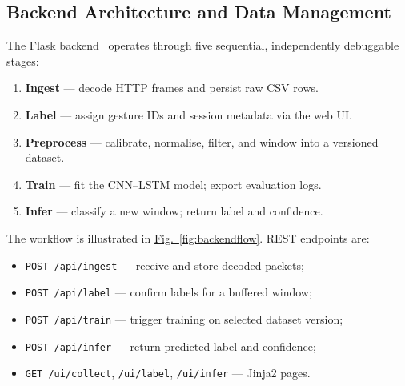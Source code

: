 \documentclass[conference]{IEEEtran}
\newcommand{\FigLink}[1]{\hyperref[#1]{Fig.~\ref*{#1}}}
\begin{document}
\subsection{Backend Architecture and Data Management}

The Flask backend~\cite{flask} operates through five sequential, independently
debuggable stages:
\begin{enumerate}[noitemsep, topsep=2pt, label=\textbf{\arabic*.}]
  \item \textbf{Ingest} — decode HTTP frames and persist raw CSV rows.
  \item \textbf{Label} — assign gesture IDs and session metadata via the web UI.
  \item \textbf{Preprocess} — calibrate, normalise, filter, and window into a
        versioned dataset.
  \item \textbf{Train} — fit the CNN--LSTM model; export evaluation logs.
  \item \textbf{Infer} — classify a new window; return label and confidence.
\end{enumerate}
The workflow is illustrated in \FigLink{fig:backendflow}. REST endpoints are:
\begin{itemize}[noitemsep, topsep=2pt]
  \item \texttt{POST /api/ingest} — receive and store decoded packets;
  \item \texttt{POST /api/label}  — confirm labels for a buffered window;
  \item \texttt{POST /api/train}  — trigger training on selected dataset version;
  \item \texttt{POST /api/infer}  — return predicted label and confidence;
  \item \texttt{GET  /ui/collect}, \texttt{/ui/label}, \texttt{/ui/infer} — Jinja2 pages.
\end{itemize}
\end{document}
